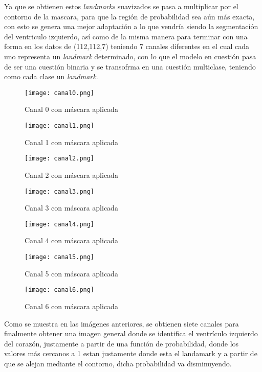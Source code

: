 \documentclass[runningheads]{llncs}
\begin{document}
Ya que se obtienen estos \textit{landmarks} suavizados se pasa a multiplicar por el contorno de la mascara, para que la región de probabilidad sea aún más exacta, con esto se genera una mejor adaptación a lo que vendría siendo la segmentación del ventriculo izquierdo, así como de la misma manera para terminar con una forma en los datos de (112,112,7) teniendo 7 canales diferentes en el cual cada uno representa un \textit{landmark} determinado, con lo que el modelo en cuestión pasa de ser una cuestión binaria y se transofrma en una cuestión multiclase, teniendo como cada clase un \textit{landmark}. 
\begin{figure} [H]
    \centering
    \texttt{[image: canal0.png]}
    \caption{Canal 0 con máscara aplicada}
    \label{fig:canal0}
\end{figure}
\begin{figure} 
    \centering
    \texttt{[image: canal1.png]}
    \caption{Canal 1 con máscara aplicada}
    \label{fig:canal1}
\end{figure}
\begin{figure} 
    \centering
    \texttt{[image: canal2.png]}
    \caption{Canal 2 con máscara aplicada}
    \label{fig:canal2}
\end{figure}
\begin{figure} 
    \centering
    \texttt{[image: canal3.png]}
    \caption{Canal 3 con máscara aplicada}
    \label{fig:canal3}
\end{figure}
\begin{figure} 
    \centering
    \texttt{[image: canal4.png]}
    \caption{Canal 4 con máscara aplicada}
    \label{fig:canal4}
\end{figure}
\begin{figure} [H]
    \centering
    \texttt{[image: canal5.png]}
    \caption{Canal 5 con máscara aplicada}
    \label{fig:canal5}
\end{figure}
\begin{figure} [H]
    \centering
    \texttt{[image: canal6.png]}
    \caption{Canal 6 con máscara aplicada}
    \label{fig:enter-label}
\end{figure}

Como se muestra en las imágenes anteriores, se obtienen siete canales para finalmente obtener una imagen general donde se identifica el ventrículo izquierdo del corazón, justamente a partir de una función de probabilidad, donde los valores más  cercanos a 1 estan justamente donde esta el landamark y a partir de que se alejan mediante el contorno, dicha probabilidad va disminuyendo.
\end{document}

